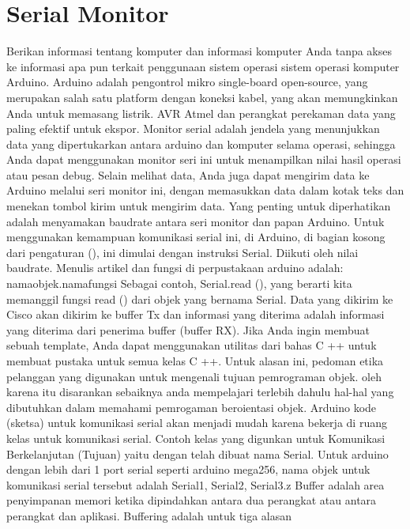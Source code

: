 \section{Serial Monitor}
Berikan informasi tentang komputer dan informasi komputer Anda tanpa akses ke informasi apa pun terkait penggunaan sistem operasi sistem operasi komputer Arduino. Arduino adalah pengontrol mikro single-board open-source, yang merupakan salah satu platform dengan koneksi kabel, yang akan memungkinkan Anda untuk memasang listrik. AVR Atmel dan perangkat perekaman data yang paling efektif untuk ekspor.
Monitor serial adalah jendela yang menunjukkan data yang dipertukarkan antara arduino dan komputer selama operasi, sehingga Anda dapat menggunakan monitor seri ini untuk menampilkan nilai hasil operasi atau pesan debug. Selain melihat data, Anda juga dapat mengirim data ke Arduino melalui seri monitor ini, dengan memasukkan data dalam kotak teks dan menekan tombol kirim untuk mengirim data. Yang penting untuk diperhatikan adalah menyamakan baudrate antara seri monitor dan papan Arduino. 
Untuk menggunakan kemampuan komunikasi serial ini, di Arduino, di bagian kosong dari pengaturan (), ini dimulai dengan instruksi Serial. Diikuti oleh nilai baudrate.
Menulis artikel dan fungsi di perpustakaan arduino adalah: namaobjek.namafungsi
Sebagai contoh, Serial.read (), yang berarti kita memanggil fungsi read () dari objek yang bernama Serial.
Data yang dikirim ke Cisco akan dikirim ke buffer Tx dan informasi yang diterima adalah informasi yang diterima dari penerima buffer (buffer RX).
Jika Anda ingin membuat sebuah template, Anda dapat menggunakan utilitas dari bahas C ++ untuk membuat pustaka untuk semua kelas C ++. Untuk alasan ini, pedoman etika pelanggan yang digunakan untuk mengenali tujuan pemrograman objek. oleh karena itu disarankan sebaiknya anda mempelajari terlebih dahulu hal-hal yang dibutuhkan dalam memahami pemrogaman beroientasi objek.
Arduino kode (sketsa) untuk komunikasi serial akan menjadi mudah karena bekerja di ruang kelas untuk komunikasi serial. Contoh kelas yang digunkan untuk Komunikasi Berkelanjutan (Tujuan) yaitu dengan telah dibuat nama Serial. Untuk arduino dengan lebih dari 1 port serial seperti arduino mega256, nama objek untuk komunikasi serial tersebut adalah Serial1, Serial2, Serial3.z
Buffer adalah area penyimpanan memori ketika dipindahkan antara dua perangkat atau antara perangkat dan aplikasi. Buffering adalah untuk tiga alasan
